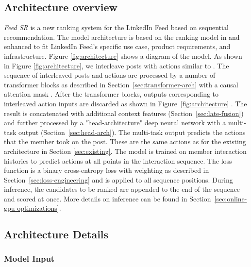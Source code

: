 \documentclass[sigconf]{acmart}
\newcommand{\systemname}{\textit{Feed SR}}
\begin{document}
\subsection{Architecture overview}\label{sec:architecure}
{\systemname} is a new ranking system for the LinkedIn Feed based on sequential recommendation. The model architecture is based on the ranking model in \cite{zhai2024actions} and enhanced to fit LinkedIn Feed's specific use case,  product requirements, and infrastructure. Figure \ref{fig:architecture} shows a diagram of the model. As shown in Figure \ref{fig:architecture}, we interleave posts with actions similar to \cite{zhai2024actions}. The sequence of interleaved posts and actions are processed by a number of transformer blocks as described in Section~\ref{sec:transformer-arch} with a causal attention mask \cite{vaswani2017attention}. After the transformer blocks, outputs corresponding to interleaved action inputs are discarded as shown in Figure~\ref{fig:architecture} \cite{zhai2024actions}. The result is concatenated with additional context features (Section~\ref{sec:late-fusion}) and further processed by a "head-architecture" deep neural network with a multi-task output (Section~\ref{sec:head-arch}). The multi-task output predicts the actions that the member took on the post. These are the same actions as for the existing architecture in Section \ref{sec:existing}. 
The model is trained on member interaction histories to predict actions at all points in the interaction sequence. The loss function is a binary cross-entropy loss with weighting as described in Section~\ref{sec:loss-engineering} and is applied to all sequence positions.
During inference, the candidates to be ranked are appended to the end of the sequence and scored at once. More details on inference can be found in Section~\ref{sec:online-gpu-optimizations}.

\subsection{Architecture Details}

\subsubsection{Model Input}\label{sec:model-input}
\end{document}
